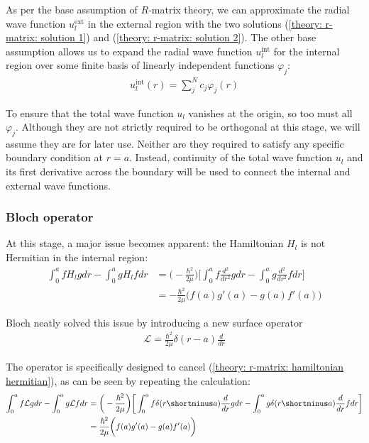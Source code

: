 As per the base assumption of $R$-matrix theory, we can approximate the radial wave function $u^{\text{ext}}_l$ in the external region with the two solutions (\ref{theory: r-matrix: solution 1}) and (\ref{theory: r-matrix: solution 2}). The other base assumption allows us to expand the radial wave function $u^{\text{int}}_l$ for the internal region over some finite basis of linearly independent functions $\varphi_j$:
\begin{align} \label{theory: r-matrix: internal expansion}
	u^{\text{int}}_l(r) = \sum^{N}_{j} c_j \varphi_j(r)
\end{align}

To ensure that the total wave function $u_l$ vanishes at the origin, so too must all $\varphi_j$. Although they are not strictly required to be orthogonal at this stage, we will assume they are for later use. Neither are they required to satisfy any specific boundary condition at $r = a$. Instead, continuity of the total wave function $u_l$ and its first derivative across the boundary will be used to connect the internal and external wave functions. 

\subsubsection{Bloch operator}
At this stage, a major issue becomes apparent: the Hamiltonian $H_l$ is not Hermitian in the internal region:
\begin{align} \label{theory: r-matrix: hamiltonian hermitian}
\int_0^a fH_lgdr - \int_0^a gH_lfdr &= \bigg(-\frac{\hbar^2}{2\mu}\bigg)\bigg[\int_0^a f \frac{d^2}{dr^2}gdr - \int_0^a g \frac{d^2}{dr^2}fdr \bigg] \nonumber \\ 
&= -\frac{\hbar^2}{2\mu}\bigg(f(a)g'(a) - g(a)f'(a)\bigg)
\end{align}

Bloch \cite{Bloch} neatly solved this issue by introducing a new surface operator
\begin{align*}
	\mathcal{L} = \frac{\hbar^2}{2\mu}\delta(r-a)\frac{d}{dr}
\end{align*}

The operator is specifically designed to cancel (\ref{theory: r-matrix: hamiltonian hermitian}), as can be seen by repeating the calculation:
\begin{align*}
	\int_0^a f \mathcal{L} g dr - \int_0^a g \mathcal{L} f dr &= \bigg(-\frac{\hbar^2}{2\mu}\bigg)\bigg[\int_0^a f \delta(r\shortminus a)\frac{d}{dr}gdr - \int_0^a g \delta(r\shortminus a)\frac{d}{dr}fdr \bigg] \nonumber \\ 
	&= \frac{\hbar^2}{2\mu}\bigg(f(a)g'(a) - g(a)f'(a)\bigg)
\end{align*}

